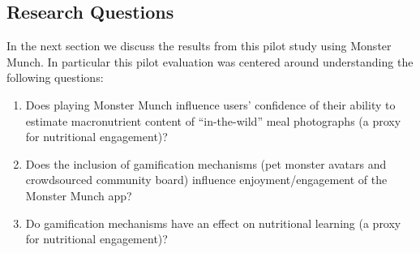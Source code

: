 \subsection{Research Questions}
In the next section we discuss the results from this pilot study using Monster Munch. In particular this pilot evaluation was centered around understanding the following questions:
\begin{enumerate}
    \item Does playing Monster Munch influence users' confidence of their ability to estimate macronutrient content of ``in-the-wild'' meal photographs (a proxy for nutritional engagement)?
    \item Does the inclusion of gamification mechanisms (pet monster avatars and crowdsourced community board) influence enjoyment/engagement of the Monster Munch app?
    \item Do gamification mechanisms have an effect on nutritional learning (a proxy for nutritional engagement)?
\end{enumerate}





